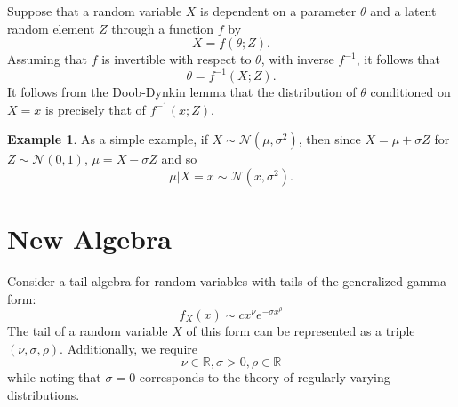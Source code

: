 \documentclass{article}
\theoremstyle{definition}
\newtheorem{example}{Example}
\begin{document}
Suppose that a random variable $X$ is dependent on a parameter $\theta$ and a latent random element $Z$ through a function $f$ by
\[
X = f(\theta; Z).
\]
Assuming that $f$ is invertible with respect to $\theta$, with inverse $f^{-1}$, it follows that
\[
\theta = f^{-1}(X; Z).
\]
It follows from the Doob-Dynkin lemma that the distribution of $\theta$ conditioned on $X = x$ is precisely that of $f^{-1}(x;Z)$.

\begin{example}
As a simple example, if $X \sim \mathcal{N}(\mu,\sigma^2)$, then since $X = \mu + \sigma Z$ for $Z \sim \mathcal{N}(0,1)$, $\mu = X - \sigma Z$ and so
\[
\mu \vert X = x \sim \mathcal{N}(x, \sigma^2).
\]
\end{example}

\section{New Algebra}

Consider a tail algebra for random variables with tails of the generalized gamma form:
\[
f_X(x) \sim c x^\nu e^{-\sigma x^\rho}
\]
The tail of a random variable $X$ of this form can be represented as a triple $(\nu,\sigma,\rho)$. Additionally, we require
\[
    \nu \in \mathbb{R}, \sigma > 0, \rho \in \mathbb{R}
\]
while noting that $\sigma = 0$ corresponds to the theory of regularly varying distributions.
\end{document}
